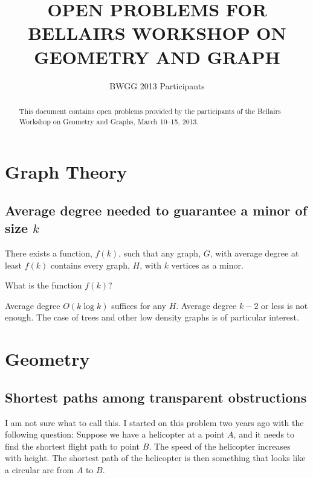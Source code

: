 \documentclass{patmorin}
\title{\MakeUppercase{Open Problems for Bellairs Workshop on Geometry and Graph}}
\author{BWGG 2013 Participants}
\newcommand{\poser}[1]{\noindent{\textit{#1}}}
\begin{document}
\begin{titlepage}
\maketitle

\begin{abstract}
  This document contains open problems provided by the participants of
  the Bellairs Workshop on Geometry and Graphs, March 10--15, 2013.
\end{abstract}
\end{titlepage}

\tableofcontents
\newpage

\section{Graph Theory}

\subsection{Average degree needed to guarantee a minor of size $k$}

\poser{Bruce Reed}

There exists a function, $f(k)$, such that any graph, $G$, with average
degree at least $f(k)$ contains every graph, $H$, with $k$ vertices as
a minor.

\begin{op}
  What is the function $f(k)$?
\end{op}

Average degree $O(k\log k)$ suffices for any $H$. Average degree $k-2$
or less is not enough.  The case of trees and other low density graphs
is of particular interest.

\section{Geometry}
\subsection{Shortest paths among transparent obstructions}

\poser{Henk Meijer}                 

I am not sure what to call this. I started on this problem two years ago
with the following question: Suppose we have a helicopter at a point $A$,
and it needs to find the shortest flight path to point $B$. The speed of
the helicopter increases with height.  The shortest path of the helicopter
is then something that looks like a circular arc from $A$ to $B$.
\end{document}
